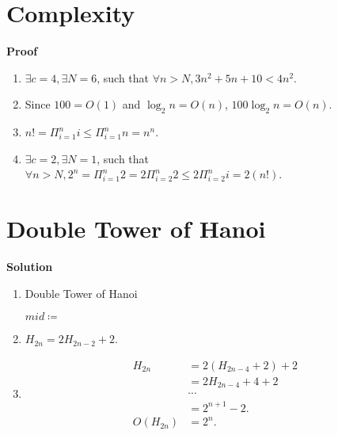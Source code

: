 \documentclass{../../cls/sig-alternate-05-2015}
\begin{document}
\section{Complexity}
\textbf{Proof}\begin{enumerate}[label=(\alph*)]
	\item $\exists c = 4, \exists N = 6$, such that $\forall n > N, 3n^2 + 5n + 10 < 4n^2$.
	\item Since $100 = O(1)$ and $\log_2 n = O(n)$, $100\log_2 n = O(n)$.
	\item $n! = \Pi_{i = 1}^n i \le \Pi_{i = 1}^n n = n^n$.
	\item $\exists c = 2, \exists N = 1$, such that $\forall n > N, 2^n = \Pi_{i = 1}^n 2 = 2 \Pi_{i = 2}^n 2 \le 2 \Pi_{i = 2}^n i = 2(n!)$.
\end{enumerate}

\section{Double Tower of Hanoi}
\textbf{Solution}\begin{enumerate}[label=(\alph*)]
	\item \begin{algorithm}[H]
		\caption{Double Tower of Hanoi}
		\label{a-3}
		\begin{algorithmic}
			\State \Return
			\State {}
			\State {}
			\Else
			\State $mid \coloneqq$ 
			\State {}
			\State {}
			\State {}
			\EndIf
			\EndProcedure
		\end{algorithmic}
	\end{algorithm}

	\item $H_{2n} = 2H_{2n - 2} + 2$.
	\item \begin{align}
		H_{2n} & = 2(H_{2n - 4} + 2) + 2\\
		& = 2H_{2n - 4} + 4 + 2\\
		& \cdots\\
		& = 2^{n + 1} - 2.\\
		O(H_{2n}) & = 2^n.
	\end{align}
\end{enumerate}
\end{document}
